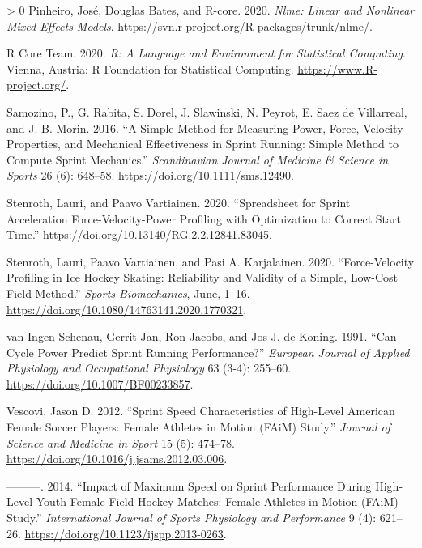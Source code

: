 \documentclass[fleqn,10pt,lineno]{wlpeerj} %
\newlength{\cslhangindent}
\newenvironment{CSLReferences}[3] %
 {%
  \setlength{\parindent}{0pt}
  \ifodd #1 \everypar{\setlength{\hangindent}{\cslhangindent}}\ignorespaces\fi
  \ifnum #2 > 0
  \setlength{\parskip}{#2\baselineskip}
  \fi
 }%
 {}
\begin{document}
\begin{CSLReferences}{1}{0}
\leavevmode\hypertarget{ref-R-nlme}{}%
Pinheiro, José, Douglas Bates, and R-core. 2020. \emph{Nlme: Linear and Nonlinear Mixed Effects Models}. \url{https://svn.r-project.org/R-packages/trunk/nlme/}.

\leavevmode\hypertarget{ref-R-base}{}%
R Core Team. 2020. \emph{R: A Language and Environment for Statistical Computing}. Vienna, Austria: R Foundation for Statistical Computing. \url{https://www.R-project.org/}.

\leavevmode\hypertarget{ref-samozinoSimpleMethodMeasuring2016}{}%
Samozino, P., G. Rabita, S. Dorel, J. Slawinski, N. Peyrot, E. Saez de Villarreal, and J.-B. Morin. 2016. {``A Simple Method for Measuring Power, Force, Velocity Properties, and Mechanical Effectiveness in Sprint Running: {Simple} Method to Compute Sprint Mechanics.''} \emph{Scandinavian Journal of Medicine \& Science in Sports} 26 (6): 648--58. \url{https://doi.org/10.1111/sms.12490}.

\leavevmode\hypertarget{ref-stenrothSpreadsheetSprintAcceleration2020}{}%
Stenroth, Lauri, and Paavo Vartiainen. 2020. {``Spreadsheet for Sprint Acceleration Force-Velocity-Power Profiling with Optimization to Correct Start Time.''} \url{https://doi.org/10.13140/RG.2.2.12841.83045}.

\leavevmode\hypertarget{ref-stenrothForcevelocityProfilingIce2020}{}%
Stenroth, Lauri, Paavo Vartiainen, and Pasi A. Karjalainen. 2020. {``Force-Velocity Profiling in Ice Hockey Skating: Reliability and Validity of a Simple, Low-Cost Field Method.''} \emph{Sports Biomechanics}, June, 1--16. \url{https://doi.org/10.1080/14763141.2020.1770321}.

\leavevmode\hypertarget{ref-vaningenschenauCanCyclePower1991}{}%
van Ingen Schenau, Gerrit Jan, Ron Jacobs, and Jos J. de Koning. 1991. {``Can Cycle Power Predict Sprint Running Performance?''} \emph{European Journal of Applied Physiology and Occupational Physiology} 63 (3-4): 255--60. \url{https://doi.org/10.1007/BF00233857}.

\leavevmode\hypertarget{ref-vescoviSprintSpeedCharacteristics2012}{}%
Vescovi, Jason D. 2012. {``Sprint Speed Characteristics of High-Level {American} Female Soccer Players: {Female Athletes} in {Motion} ({FAiM}) {Study}.''} \emph{Journal of Science and Medicine in Sport} 15 (5): 474--78. \url{https://doi.org/10.1016/j.jsams.2012.03.006}.

\leavevmode\hypertarget{ref-vescoviImpactMaximumSpeed2014}{}%
---------. 2014. {``Impact of {Maximum Speed} on {Sprint Performance During High}-{Level Youth Female Field Hockey Matches}: {Female Athletes} in {Motion} ({FAiM}) {Study}.''} \emph{International Journal of Sports Physiology and Performance} 9 (4): 621--26. \url{https://doi.org/10.1123/ijspp.2013-0263}.


\end{CSLReferences}
\end{document}
